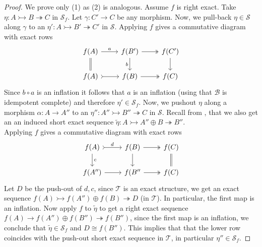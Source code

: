 \documentclass[11pt,a4paper]{amsart}
\theoremstyle{plain}
\theoremstyle{definition}
\newcommand{\defl}{\twoheadrightarrow}
\newcommand{\infl}{\rightarrowtail}
\newcommand{\mcB}{\mathcal{B}}
\newcommand{\mcS}{\mathcal{S}}
\newcommand{\mcT}{\mathcal{T}}
\begin{document}
\begin{proof}
We prove only (1) as (2) is analogous. 
Assume $f$ is right exact. 
Take $\eta \colon A \infl B \defl C $ in $\mcS_f$. Let $\gamma \colon C'\to C$ be any morphism. Now, we pull-back $\eta \in \mcS$ along $\gamma $ to an $\eta' \colon A \infl B' \defl C' $ in $\mcS$. Applying $f$ gives a commutative diagram with exact rows 
\[ 
\begin{tikzcd}
f(A) \arrow[r, "a"] \arrow[d,-,double equal sign distance,double]  & f(B') \arrow[r, two heads] \arrow[d, "b"'] & f(C') \arrow[d] \\
f(A) \arrow[r, tail]          & f(B) \arrow[r, two heads]                  & f(C)           
\end{tikzcd}
\]
Since $b\circ a$ is an inflation it follows that $a$ is an inflation (using that $\mcB$ is idempotent complete) and therefore $\eta'\in \mcS_f$.
Now, we pushout $\eta $ along a morphism $\alpha \colon A\to A''$ to an $\eta''\colon A'' \infl B'' \defl C $ in $\mcS$. Recall from \cite[Prop. 2.12]{Bue},  that we also get an an induced short exact sequence $\tilde{\eta}\colon  A \infl A''\oplus B \defl B'' $. \\
Applying $f$ gives a commutative diagram with exact rows
\[ 
\begin{tikzcd}
f(A) \arrow[r, "d", tail] \arrow[d, "c"] & f(B) \arrow[r, two heads] \arrow[d] & f(C) \arrow[d,-,double equal sign distance,double] \\
f(A'') \arrow[r]                         & f(B'' \arrow[r, two heads]          & f(C)          
\end{tikzcd}
\]
Let $D$ be the push-out of $d,c$, since $\mcT$ is an exact structure, we get an exact sequence $ f(A) \infl f(A'') \oplus f(B) \defl D $ (in $\mcT$). In particular, the first map is an inflation. Now apply $f$ to $\tilde{\eta}$ to get a right exact sequence $f(A) \to f(A'') \oplus f(B'') \defl f(B'') $, since the first map is an inflation, we conclude that $\tilde{\eta} \in \mcS_f$ and $D\cong f(B'')$. This implies that that the lower row coincides with the push-out short exact sequence in $\mcT$, in particular $\eta'' \in \mcS_f$. 




\end{proof}
\end{document}
